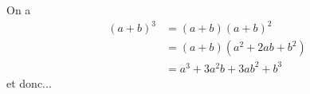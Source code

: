 \documentclass[10pt,a4paper]{article}
\begin{document}
On a
\begin{align}
(a+b)^3 &= (a+b)(a+b)^2 \\
		&= (a+b)(a^2+2ab+b^2) \\
		&= a^3+3a^2b+3ab^2+b^3
\end{align}
et donc...
\end{document}
